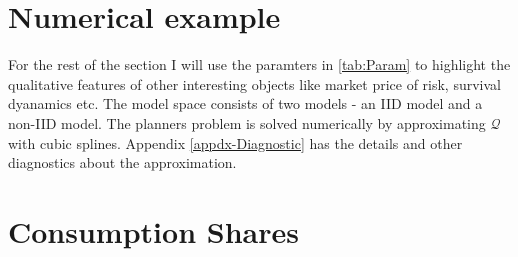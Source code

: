 \documentclass[12pt]{article}
\begin{document}
\section{Numerical example}
For the rest of the section I will use the  paramters in \ref{tab:Param} to highlight the qualitative features of other interesting objects like market price of risk, survival dyanamics etc. The model space consists of two models  - an IID model and a non-IID model.  The planners problem is solved numerically by approximating $\mathcal{Q}$ with cubic splines. Appendix \ref{appdx-Diagnostic} has the details and other diagnostics about the approximation.




\section{Consumption Shares}
\end{document}
